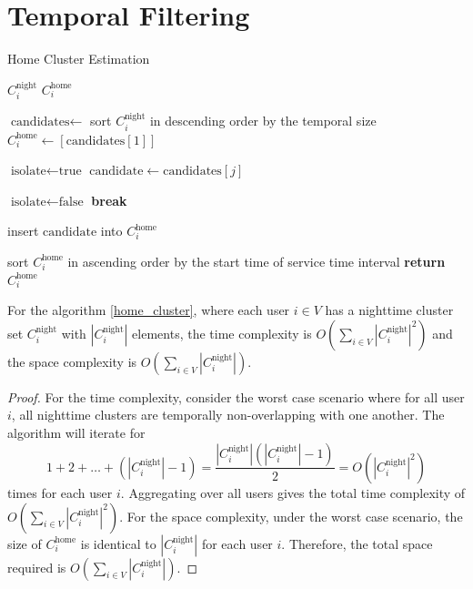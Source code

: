\section{Temporal Filtering}
\begin{algorithm}[h!]
\renewcommand{\algorithmicrequire}{\textbf{Input:}}
\renewcommand{\algorithmicensure}{\textbf{Output:}}
\caption{Home Cluster Estimation}
\label{home_cluster}
\begin{algorithmic}[1]
    \REQUIRE $C^\text{night}_i$
    \ENSURE $C^\text{home}_i$

    \STATE $\text{candidates} \leftarrow$ sort $C^\text{night}_i$ in descending order by the temporal size
    \STATE $C^\text{home}_i \leftarrow [\text{candidates}[1]]$
    \STATE

        \STATE $\text{isolate} \gets \text{true}$
        \STATE $\text{candidate} \gets \text{candidates}[j]$
        \STATE

                \STATE $\text{isolate} \gets \text{false}$
                \STATE \textbf{break}
            \ENDIF
        \ENDFOR
        \STATE

            \STATE insert $\text{candidate}$ into $C^\text{home}_i$
        \ENDIF
    \ENDFOR
    \STATE

    \STATE sort $C^\text{home}_i$ in ascending order by the start time of service time interval
    \STATE \textbf{return} $C^\text{home}_i$
\end{algorithmic}
\end{algorithm}

\begin{theorem}
For the algorithm \ref{home_cluster}, where each user $i \in V$ has a nighttime cluster set $C^{\text{night}}_i$ with $|C^{\text{night}}_i|$ elements, the time complexity is $O\left(\sum_{i \in V} |C^{\text{night}}_i|^2\right)$ and the space complexity is $O\left(\sum_{i \in V} |C^{\text{night}}_i|\right)$.
\end{theorem}

\begin{proof}
For the time complexity, consider the worst case scenario where for all user $i$, all nighttime clusters are temporally non-overlapping with one another. The algorithm will iterate for
$$
1+2+\ldots+(|C^{\text{night}}_i|-1) = \frac{|C^{\text{night}}_i|(|C^{\text{night}}_i|-1)}{2} = O(|C^{\text{night}}_i|^2)
$$
times for each user $i$. Aggregating over all users gives the total time complexity of $O\left(\sum_{i \in V} |C^{\text{night}}_i|^2\right)$.
For the space complexity, under the worst case scenario, the size of $C^{\text{home}}_i$ is identical to $|C^{\text{night}}_i|$ for each user $i$. Therefore, the total space required is $O\left(\sum_{i \in V} |C^{\text{night}}_i|\right)$.
\end{proof}


